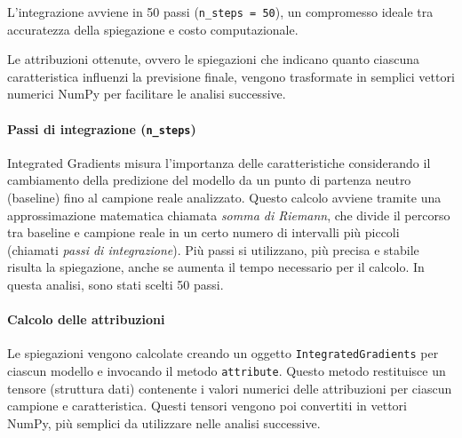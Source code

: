 \documentclass[a4paper,11pt]{article}
\begin{document}
L'integrazione avviene in 50 passi (\texttt{n\_steps = 50}), un compromesso ideale tra accuratezza della spiegazione e costo computazionale.

Le attribuzioni ottenute, ovvero le spiegazioni che indicano quanto ciascuna caratteristica influenzi la previsione finale, vengono trasformate in semplici vettori numerici NumPy per facilitare le analisi successive.

\paragraph{Passi di integrazione (\texttt{n\_steps})}
Integrated Gradients misura l'importanza delle caratteristiche considerando il cambiamento della predizione del modello da un punto di partenza neutro (baseline) fino al campione reale analizzato. Questo calcolo avviene tramite una approssimazione matematica chiamata \emph{somma di Riemann}, che divide il percorso tra baseline e campione reale in un certo numero di intervalli più piccoli (chiamati \emph{passi di integrazione}). Più passi si utilizzano, più precisa e stabile risulta la spiegazione, anche se aumenta il tempo necessario per il calcolo. In questa analisi, sono stati scelti 50 passi.

\paragraph{Calcolo delle attribuzioni}
Le spiegazioni vengono calcolate creando un oggetto \texttt{IntegratedGradients} per ciascun modello e invocando il metodo \texttt{attribute}. Questo metodo restituisce un tensore (struttura dati) contenente i valori numerici delle attribuzioni per ciascun campione e caratteristica. Questi tensori vengono poi convertiti in vettori NumPy, più semplici da utilizzare nelle analisi successive.
\end{document}
